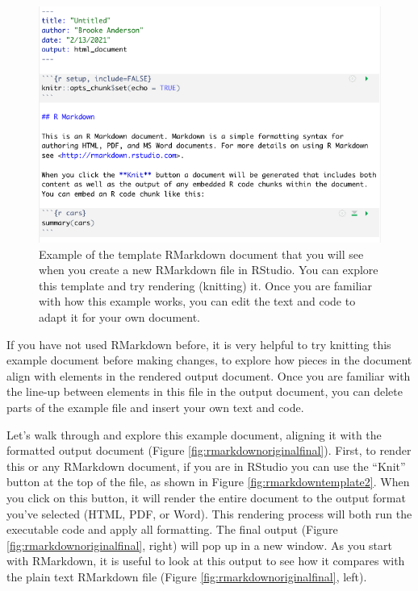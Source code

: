 \documentclass[]{tufte-book}
\begin{document}
\begin{figure}
\includegraphics[width=\textwidth]{figures/rmarkdown_template} \caption[Example of the template RMarkdown document that you will see when you create a new RMarkdown file in RStudio]{Example of the template RMarkdown document that you will see when you create a new RMarkdown file in RStudio. You can explore this template and try rendering (knitting) it. Once you are familiar with how this example works, you can edit the text and code to adapt it for your own document.}\label{fig:rmarkdowntemplate}
\end{figure}

If you have not used RMarkdown before, it is very helpful to try knitting this
example document before making changes, to explore how pieces in the document
align with elements in the rendered output document. Once you are
familiar with the line-up between elements in this file in the output document,
you can delete parts of the example file and insert your own text and code.

Let's walk through and explore this example document, aligning it
with the formatted output document (Figure \ref{fig:rmarkdownoriginalfinal}).
First, to render this or any RMarkdown document, if you are in RStudio you can
use the ``Knit'' button at the top of the file, as shown in Figure
\ref{fig:rmarkdowntemplate2}. When you click on this button, it will render the
entire document to the output format you've selected (HTML, PDF, or Word). This
rendering process will both run the executable code and apply all formatting.
The final output (Figure \ref{fig:rmarkdownoriginalfinal}, right) will pop up
in a new window. As you start with RMarkdown, it is useful to look at this
output to see how it compares with the plain text RMarkdown file (Figure
\ref{fig:rmarkdownoriginalfinal}, left).
\end{document}

